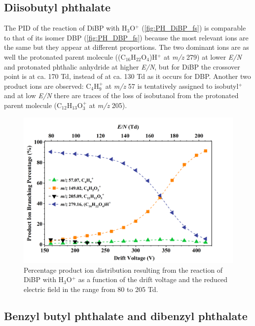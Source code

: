 \subsection{Diisobutyl phthalate}

The PID of the reaction of DiBP with H$_3$O$^+$ (\autoref{fig:PH_DiBP_fs}) is comparable to that of its isomer DBP (\autoref{fig:PH_DBP_fs}) because the most relevant ions are the same but they appear at different  proportions.
The two dominant ions are as well the protonated parent molecule ((C$_{16}$H$_{22}$O$_4$)H$^+$ at \textit{m/z} 279) at lower \textit{E/N} and protonated phthalic anhydride at higher \textit{E/N}, but for DiBP the crossover point is at ca. 170 Td, instead of at ca. 130 Td as it occurs for DBP.
Another two product ions are observed:  C$_4$H$_9^+$ at \textit{m/z} 57 is tentatively assigned to isobutyl$^+$ and 
at low \textit{E/N} there are traces of the loss of isobutanol from the protonated parent molecule (C$_{12}$H$_{13}$O$_3^+$ at \textit{m/z} 205).




\begin{figure}[htb]%
\centering
\includegraphics[height=0.4\textheight]{pics/DiBP-BR.png}
\caption{Percentage product ion distribution resulting from the reaction of DiBP with H$_3$O$^+$ as a function of the drift voltage and the reduced electric field in the range from 80 to 205 Td.}
\label{fig:PH_DiBP_fs}
\end{figure}





\subsection{Benzyl butyl phthalate
and dibenzyl phthalate}

